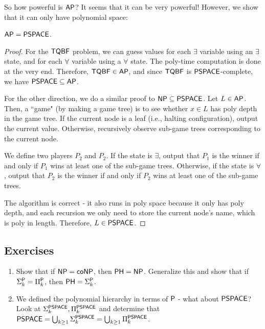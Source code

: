 So how powerful is $\AP$? It seems that it can be very powerful! However, we show that it can only have polynomial space:
\begin{theorem}
$\AP = \PSPACE$.
\end{theorem}

\begin{proof}
For the $\TQBF$ problem, we can guess values for each $\exists$ variable using an $\exists$ state, and for each $\forall$ variable using a $\forall$ state. The poly-time computation is done at the very end. Therefore, $\TQBF \in \AP$, and since $\TQBF$ is $\PSPACE$-complete, we have $\PSPACE \subseteq \AP$.

\par For the other direction, we do a similar proof to $\NP \subseteq \PSPACE$. Let $L \in \AP$. Then, a ``game" (by making a game tree) is to see whether $x \in L$ has poly depth in the game tree. If the current node is a leaf (i.e., halting configuration), output the current value. Otherwise, recursively observe sub-game trees corresponding to the current node. 

\par We define two players $P_2$ and $P_2$. If the state is $\exists$, output that $P_1$ is the winner if and only if $P_1$ wins at least one of the sub-game trees. Otherwise, if the state is $\forall$, output that $P_2$ is the winner if and only if $P_2$ wins at least one of the sub-game trees. 

\par The algorithm is correct - it also runs in poly space because it only has poly depth, and each recursion we only need to store the current node's name, which is poly in length. Therefore, $L \in \PSPACE$.
\end{proof}

\subsection{Exercises}
\begin{enumerate}

\item Show that if $\NP = \coNP$, then $\PH = \NP$. Generalize this and show that if $\Sigma_k^\P = \Pi_k^\P$, then $\PH = \Sigma_k^\P$.

\item We defined the polynomial hierarchy in terms of $\P$ - what about $\PSPACE$? Look at $\Sigma_k^\PSPACE, \Pi_k^\PSPACE$ and determine that $\PSPACE = \bigcup_{k \ge 1} \Sigma_k^\PSPACE = \bigcup_{k \ge 1} \Pi_k^\PSPACE$.
\end{enumerate}